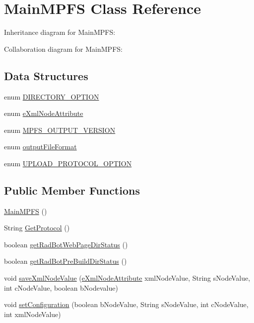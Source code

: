 \hypertarget{class_microchip_m_p_f_s_1_1_main_m_p_f_s}{}\section{Main\+M\+P\+F\+S Class Reference}
\label{class_microchip_m_p_f_s_1_1_main_m_p_f_s}


Inheritance diagram for Main\+M\+P\+F\+S\+:


Collaboration diagram for Main\+M\+P\+F\+S\+:
\subsection*{Data Structures}
\begin{DoxyCompactItemize}
\item 
enum \hyperlink{enum_microchip_m_p_f_s_1_1_main_m_p_f_s_1_1_d_i_r_e_c_t_o_r_y___o_p_t_i_o_n}{D\+I\+R\+E\+C\+T\+O\+R\+Y\+\_\+\+O\+P\+T\+I\+O\+N}
\item 
enum \hyperlink{enum_microchip_m_p_f_s_1_1_main_m_p_f_s_1_1e_xml_node_attribute}{e\+Xml\+Node\+Attribute}
\item 
enum \hyperlink{enum_microchip_m_p_f_s_1_1_main_m_p_f_s_1_1_m_p_f_s___o_u_t_p_u_t___v_e_r_s_i_o_n}{M\+P\+F\+S\+\_\+\+O\+U\+T\+P\+U\+T\+\_\+\+V\+E\+R\+S\+I\+O\+N}
\item 
enum \hyperlink{enum_microchip_m_p_f_s_1_1_main_m_p_f_s_1_1output_file_format}{output\+File\+Format}
\item 
enum \hyperlink{enum_microchip_m_p_f_s_1_1_main_m_p_f_s_1_1_u_p_l_o_a_d___p_r_o_t_o_c_o_l___o_p_t_i_o_n}{U\+P\+L\+O\+A\+D\+\_\+\+P\+R\+O\+T\+O\+C\+O\+L\+\_\+\+O\+P\+T\+I\+O\+N}
\end{DoxyCompactItemize}
\subsection*{Public Member Functions}
\begin{DoxyCompactItemize}
\item 
\hyperlink{class_microchip_m_p_f_s_1_1_main_m_p_f_s_a90442339f2be472c5eaa68c0834837b1}{Main\+M\+P\+F\+S} ()
\item 
String \hyperlink{class_microchip_m_p_f_s_1_1_main_m_p_f_s_a54a250fc332e2458ac8e6340da7d7d99}{Get\+Protocol} ()
\item 
boolean \hyperlink{class_microchip_m_p_f_s_1_1_main_m_p_f_s_aad13e62fa9a28756e0dc1c56da8ec607}{get\+Rad\+Bot\+Web\+Page\+Dir\+Status} ()
\item 
boolean \hyperlink{class_microchip_m_p_f_s_1_1_main_m_p_f_s_a050d5c77dc1646b98dface06ec6f8640}{get\+Rad\+Bot\+Pre\+Build\+Dir\+Status} ()
\item 
void \hyperlink{class_microchip_m_p_f_s_1_1_main_m_p_f_s_ab8bf30a1dd4e09cd9c02136065ed7f11}{save\+Xml\+Node\+Value} (\hyperlink{enum_microchip_m_p_f_s_1_1_main_m_p_f_s_1_1e_xml_node_attribute}{e\+Xml\+Node\+Attribute} xml\+Node\+Value, String s\+Node\+Value, int c\+Node\+Value, boolean b\+Nodevalue)
\item 
void \hyperlink{class_microchip_m_p_f_s_1_1_main_m_p_f_s_a19bfdc35f114bedbd3a5d0dc45fa937b}{set\+Configuration} (boolean b\+Node\+Value, String s\+Node\+Value, int c\+Node\+Value, int xml\+Node\+Value)
\end{DoxyCompactItemize}
